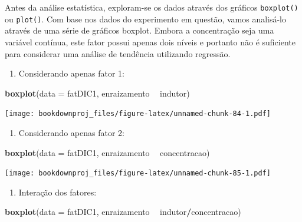 \documentclass[
]{article}
\newenvironment{Shaded}{\begin{snugshade}}{\end{snugshade}}
\newcommand{\DataTypeTok}[1]{\textcolor[rgb]{0.13,0.29,0.53}{#1}}
\newcommand{\KeywordTok}[1]{\textcolor[rgb]{0.13,0.29,0.53}{\textbf{#1}}}
\newcommand{\NormalTok}[1]{#1}
\newcommand{\OperatorTok}[1]{\textcolor[rgb]{0.81,0.36,0.00}{\textbf{#1}}}
\newcommand{\StringTok}[1]{\textcolor[rgb]{0.31,0.60,0.02}{#1}}
\providecommand{\tightlist}{%
  \setlength{\itemsep}{0pt}\setlength{\parskip}{0pt}}
\begin{document}
Antes da análise estatística, exploram-se os dados através dos gráficos \texttt{boxplot()} ou \texttt{plot()}. Com base nos dados do experimento em questão, vamos analisá-lo através de uma série de gráficos boxplot. Embora a concentração seja uma variável contínua, este fator possui apenas dois níveis e portanto não é suficiente para considerar uma análise de tendência utilizando regressão.

\begin{enumerate}
\def\labelenumi{\arabic{enumi}.}
\tightlist
\item
  Considerando apenas fator 1:
\end{enumerate}

\begin{Shaded}
\begin{Highlighting}[]
\KeywordTok{boxplot}\NormalTok{(}\DataTypeTok{data =}\NormalTok{ fatDIC1, enraizamento }\OperatorTok{~}\StringTok{ }\NormalTok{indutor)}
\end{Highlighting}
\end{Shaded}

\texttt{[image: bookdownproj\_files/figure-latex/unnamed-chunk-84-1.pdf]}

\begin{enumerate}
\def\labelenumi{\arabic{enumi}.}
\setcounter{enumi}{1}
\tightlist
\item
  Considerando apenas fator 2:
\end{enumerate}

\begin{Shaded}
\begin{Highlighting}[]
\KeywordTok{boxplot}\NormalTok{(}\DataTypeTok{data =}\NormalTok{ fatDIC1, enraizamento }\OperatorTok{~}\StringTok{ }\NormalTok{concentracao)}
\end{Highlighting}
\end{Shaded}

\texttt{[image: bookdownproj\_files/figure-latex/unnamed-chunk-85-1.pdf]}

\begin{enumerate}
\def\labelenumi{\arabic{enumi}.}
\setcounter{enumi}{2}
\tightlist
\item
  Interação dos fatores:
\end{enumerate}

\begin{Shaded}
\begin{Highlighting}[]
\KeywordTok{boxplot}\NormalTok{(}\DataTypeTok{data =}\NormalTok{ fatDIC1, enraizamento }\OperatorTok{~}\StringTok{ }\NormalTok{indutor}\OperatorTok{/}\NormalTok{concentracao)}
\end{Highlighting}
\end{Shaded}
\end{document}
